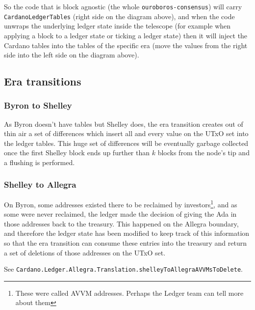 \documentclass[11pt,a4paper]{article}
\newcommand{\htt}[1]{\texttt{#1}}
\theoremstyle{definition}
\begin{document}
So the code that is block agnostic (the whole \texttt{ouroboros-consensus}) will
carry \htt{CardanoLedgerTables} (right side on the diagram above), and when the
code unwraps the underlying ledger state inside the telescope (for example when
applying a block to a ledger state or ticking a ledger state) then it will
inject the Cardano tables into the tables of the specific era (move the values
from the right side into the left side on the diagram above).

\subsection{Era transitions}
\label{sec:eratrans}

\subsubsection{Byron to Shelley}

As Byron doesn't have tables but Shelley does, the era transition creates out of
thin air a set of differences which insert all and every value on the UTxO set
into the ledger tables. This huge set of differences will be eventually garbage
collected once the first Shelley block ends up further than $k$ blocks from the
node's tip and a flushing is performed.

\subsubsection{Shelley to Allegra}

On Byron, some addresses existed there to be reclaimed by
investors\footnote{These were called AVVM addresses. Perhaps the Ledger team can
  tell more about them}, and as some were never reclaimed, the ledger made the
decision of giving the Ada in those addresses back to the treasury. This
happened on the Allegra boundary, and therefore the ledger state has been
modified to keep track of this information so that the era transition can
consume these entries into the treasury and return a set of deletions of those
addresses on the UTxO set.

See \texttt{Cardano.Ledger.Allegra.Translation.shelleyToAllegraAVVMsToDelete}.

\end{document}
